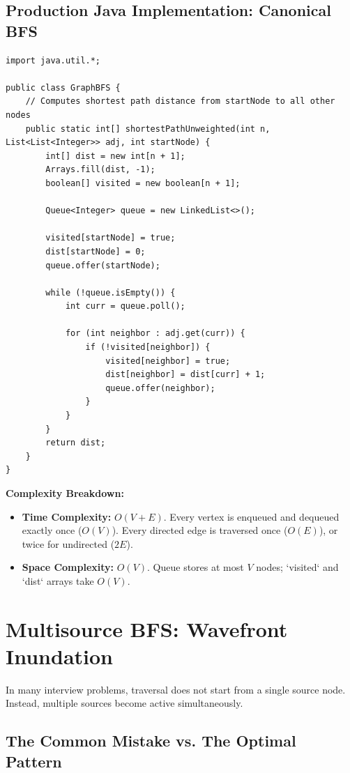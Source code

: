 \documentclass[10pt,journal,compsoc,onecolumn]{IEEEtran}
\begin{document}
\subsection{Production Java Implementation: Canonical BFS}

\begin{verbatim}
import java.util.*;

public class GraphBFS {
    // Computes shortest path distance from startNode to all other nodes
    public static int[] shortestPathUnweighted(int n, List<List<Integer>> adj, int startNode) {
        int[] dist = new int[n + 1];
        Arrays.fill(dist, -1);
        boolean[] visited = new boolean[n + 1];

        Queue<Integer> queue = new LinkedList<>();

        visited[startNode] = true;
        dist[startNode] = 0;
        queue.offer(startNode);

        while (!queue.isEmpty()) {
            int curr = queue.poll();

            for (int neighbor : adj.get(curr)) {
                if (!visited[neighbor]) {
                    visited[neighbor] = true;
                    dist[neighbor] = dist[curr] + 1;
                    queue.offer(neighbor);
                }
            }
        }
        return dist;
    }
}
\end{verbatim}

\textbf{Complexity Breakdown:}
\begin{itemize}
    \item \textbf{Time Complexity:} $O(V + E)$. Every vertex is enqueued and dequeued exactly once ($O(V)$). Every directed edge is traversed once ($O(E)$), or twice for undirected ($2E$).
    \item \textbf{Space Complexity:} $O(V)$. Queue stores at most $V$ nodes; `visited` and `dist` arrays take $O(V)$.
\end{itemize}

\section{Multisource BFS: Wavefront Inundation}
\label{sec:multisource}

In many interview problems, traversal does not start from a single source node. Instead, multiple sources become active simultaneously.

\subsection{The Common Mistake vs. The Optimal Pattern}
\end{document}
